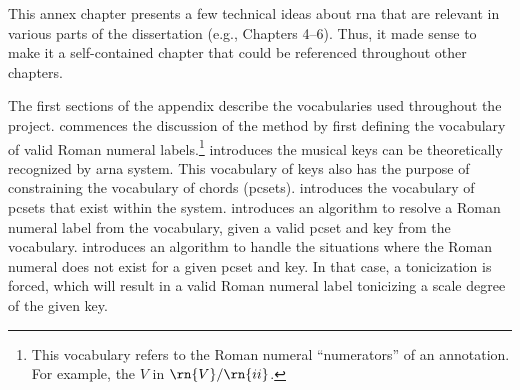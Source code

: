 
This annex chapter presents a few technical ideas about
\gls{rna} that are relevant in various parts of the
dissertation (e.g., Chapters 4--6). Thus, it made sense to
make it a self-contained chapter that could be referenced
throughout other chapters.

The first sections of the appendix describe the vocabularies
used throughout the project.
 commences the
discussion of the method by first defining the vocabulary of
valid Roman numeral labels.\footnote{This vocabulary refers
to the Roman numeral ``numerators'' of an annotation. For
example, the $V$ in $\rn{V}/\rn{ii}$.}
 introduces the musical
keys can be theoretically recognized by \gls{arna} system.
This vocabulary of keys also has the purpose of constraining
the vocabulary of chords (\gls{pcset}s).
 introduces the
vocabulary of \gls{pcset}s that exist within the system.
introduces an algorithm to resolve a Roman numeral label
from the vocabulary, given a valid \gls{pcset} and key from
the vocabulary. 
introduces an algorithm to handle the situations where the
Roman numeral does not exist for a given \gls{pcset} and
key. In that case, a tonicization is forced, which will
result in a valid Roman numeral label tonicizing a scale
degree of the given key.
